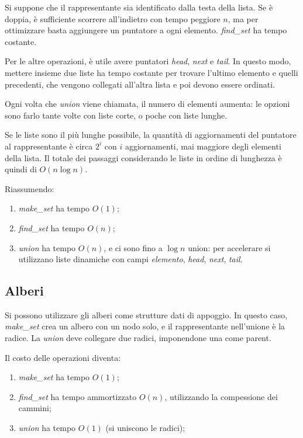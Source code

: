 Si suppone che il rappresentante sia identificato dalla testa della lista. Se è doppia, è sufficiente scorrere all'indietro con tempo peggiore $n$, ma per ottimizzare basta aggiungere un puntatore a ogni elemento. \textit{find\_set} ha tempo costante. 

Per le altre operazioni, è utile avere puntatori \textit{head}, \textit{next} e \textit{tail}. In questo modo, mettere insieme due liste ha tempo costante per trovare l'ultimo elemento e quelli precedenti, che vengono collegati all'altra lista e poi devono essere ordinati.

Ogni volta che \textit{union} viene chiamata, il numero di elementi aumenta: le opzioni sono farlo tante volte con liste corte, o poche con liste lunghe.

Se le liste sono il più lunghe possibile, la quantità di aggiornamenti del puntatore al rappresentante è circa $2^i$ con $i$ aggiornamenti, mai maggiore degli elementi della lista. Il totale dei passaggi considerando le liste in ordine di lunghezza è quindi di $O(n\log n)$. 

Riassumendo:
\begin{enumerate}
	\item \textit{make\_set} ha tempo $O(1)$;
	\item \textit{find\_set} ha tempo $O(n)$;
	\item \textit{union} ha tempo $O(n)$, e ci sono fino a $\log n$ union: per accelerare si utilizzano liste dinamiche con campi \textit{elemento}, \textit{head}, \textit{next}, \textit{tail}.
\end{enumerate}

\subsection{Alberi}
Si possono utilizzare gli alberi come strutture dati di appoggio. In questo caso, \textit{make\_set} crea un albero con un nodo solo, e il rappresentante nell'unione è la radice. La \textit{union} deve collegare due radici, imponendone una come parent. 

Il costo delle operazioni diventa:
\begin{enumerate}
	\item \textit{make\_set} ha tempo $O(1)$;
	\item \textit{find\_set} ha tempo ammortizzato $O(n)$, utilizzando la compessione dei cammini;
	\item \textit{union} ha tempo $O(1)$ (si uniscono le radici);
\end{enumerate}

